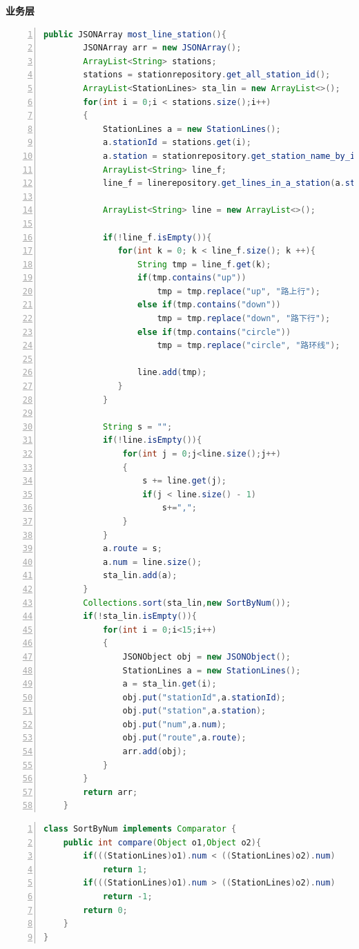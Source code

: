 \documentclass[11pt,a4paper]{article}
\begin{document}
\textbf{业务层} \\
\begin{lstlisting}[numbers = left, 
showstringspaces=false,
showspaces = false,
breaklines = true, 
language=Java]
    public JSONArray most_line_station(){
        JSONArray arr = new JSONArray();
        ArrayList<String> stations;
        stations = stationrepository.get_all_station_id();
        ArrayList<StationLines> sta_lin = new ArrayList<>();
        for(int i = 0;i < stations.size();i++)
        {
            StationLines a = new StationLines();
            a.stationId = stations.get(i);
            a.station = stationrepository.get_station_name_by_id(a.stationId);
            ArrayList<String> line_f;
            line_f = linerepository.get_lines_in_a_station(a.stationId);

            ArrayList<String> line = new ArrayList<>();

            if(!line_f.isEmpty()){
               for(int k = 0; k < line_f.size(); k ++){
                   String tmp = line_f.get(k);
                   if(tmp.contains("up"))
                       tmp = tmp.replace("up", "路上行");
                   else if(tmp.contains("down"))
                       tmp = tmp.replace("down", "路下行");
                   else if(tmp.contains("circle"))
                       tmp = tmp.replace("circle", "路环线");

                   line.add(tmp);
               }
            }

            String s = "";
            if(!line.isEmpty()){
                for(int j = 0;j<line.size();j++)
                {
                    s += line.get(j);
                    if(j < line.size() - 1)
                        s+=",";
                }
            }
            a.route = s;
            a.num = line.size();
            sta_lin.add(a);
        }
        Collections.sort(sta_lin,new SortByNum());
        if(!sta_lin.isEmpty()){
            for(int i = 0;i<15;i++)
            {
                JSONObject obj = new JSONObject();
                StationLines a = new StationLines();
                a = sta_lin.get(i);
                obj.put("stationId",a.stationId);
                obj.put("station",a.station);
                obj.put("num",a.num);
                obj.put("route",a.route);
                arr.add(obj);
            }
        }
        return arr;
    }
\end{lstlisting} 
\begin{lstlisting}[numbers = left, 
showstringspaces=false,
showspaces = false,
breaklines = true, 
language=Java]
class SortByNum implements Comparator {
    public int compare(Object o1,Object o2){
        if(((StationLines)o1).num < ((StationLines)o2).num)
            return 1;
        if(((StationLines)o1).num > ((StationLines)o2).num)
            return -1;
        return 0;
    }
}
\end{lstlisting} 
\end{document}
